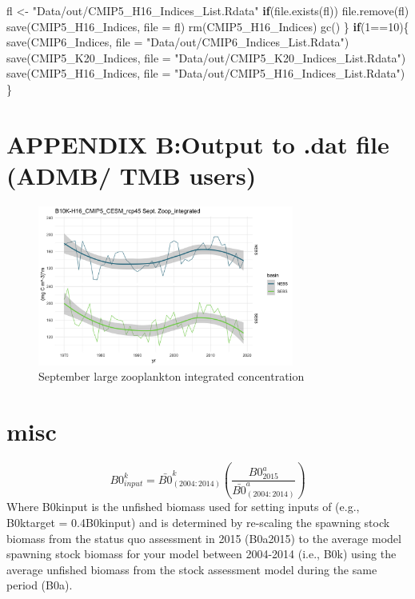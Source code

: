 \documentclass[
]{article}
\newenvironment{Shaded}{\begin{snugshade}}{\end{snugshade}}
\newcommand{\AttributeTok}[1]{\textcolor[rgb]{0.77,0.63,0.00}{#1}}
\newcommand{\ControlFlowTok}[1]{\textcolor[rgb]{0.13,0.29,0.53}{\textbf{#1}}}
\newcommand{\DecValTok}[1]{\textcolor[rgb]{0.00,0.00,0.81}{#1}}
\newcommand{\FunctionTok}[1]{\textcolor[rgb]{0.00,0.00,0.00}{#1}}
\newcommand{\NormalTok}[1]{#1}
\newcommand{\OtherTok}[1]{\textcolor[rgb]{0.56,0.35,0.01}{#1}}
\newcommand{\SpecialCharTok}[1]{\textcolor[rgb]{0.00,0.00,0.00}{#1}}
\newcommand{\StringTok}[1]{\textcolor[rgb]{0.31,0.60,0.02}{#1}}
\begin{document}
\begin{Shaded}
\begin{Highlighting}[]
\NormalTok{      fl }\OtherTok{\textless{}{-}} \StringTok{"Data/out/CMIP5\_H16\_Indices\_List.Rdata"}
      \ControlFlowTok{if}\NormalTok{(}\FunctionTok{file.exists}\NormalTok{(fl)) }\FunctionTok{file.remove}\NormalTok{(fl)}
      \FunctionTok{save}\NormalTok{(CMIP5\_H16\_Indices, }\AttributeTok{file =}\NormalTok{ fl)}
      \FunctionTok{rm}\NormalTok{(CMIP5\_H16\_Indices)}
      \FunctionTok{gc}\NormalTok{()}
\NormalTok{    \}}
    \ControlFlowTok{if}\NormalTok{(}\DecValTok{1}\SpecialCharTok{==}\DecValTok{10}\NormalTok{)\{}
      \FunctionTok{save}\NormalTok{(CMIP6\_Indices, }\AttributeTok{file =} \StringTok{"Data/out/CMIP6\_Indices\_List.Rdata"}\NormalTok{)}
      \FunctionTok{save}\NormalTok{(CMIP5\_K20\_Indices, }\AttributeTok{file =} \StringTok{"Data/out/CMIP5\_K20\_Indices\_List.Rdata"}\NormalTok{)}
      \FunctionTok{save}\NormalTok{(CMIP5\_H16\_Indices, }\AttributeTok{file =} \StringTok{"Data/out/CMIP5\_H16\_Indices\_List.Rdata"}\NormalTok{)}
\NormalTok{    \}}
\end{Highlighting}
\end{Shaded}

\hypertarget{appendix-boutput-to-.dat-file-admb-tmb-users}{%
\section{APPENDIX B:Output to .dat file (ADMB/ TMB
users)}\label{appendix-boutput-to-.dat-file-admb-tmb-users}}

\begin{figure}
\centering
\includegraphics[width=0.75\textwidth,height=\textheight]{Figs/Hind_Sept_large_Zoop.jpg}
\caption{September large zooplankton integrated concentration}
\end{figure}

\hypertarget{misc}{%
\section{misc}\label{misc}}

\[B0^k_{input}= \bar{B0}^k_{(2004:2014)}\left(\frac{B0^{a}_{2015}}{\bar{B0}^a_{(2004:2014)}}\right) \]
Where B0kinput is the unfished biomass used for setting inputs of (e.g.,
B0ktarget = 0.4B0kinput) and is determined by re-scaling the spawning
stock biomass from the status quo assessment in 2015 (B0a2015) to the
average model spawning stock biomass for your model between 2004-2014
(i.e., B0k) using the average unfished biomass from the stock assessment
model during the same period (B0a).
\end{document}
